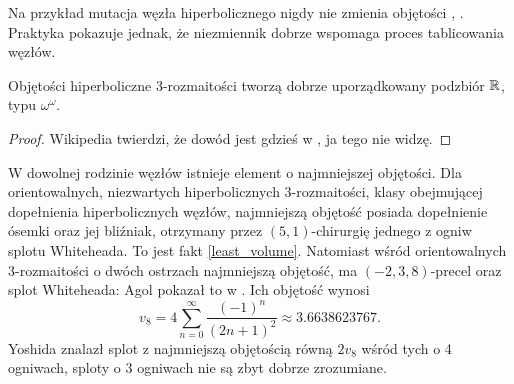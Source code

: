 Na przykład mutacja węzła hiperbolicznego nigdy nie zmienia objętości \cite{ruberman87}, \cite[s. 124]{adams94}.
Praktyka pokazuje jednak, że niezmiennik dobrze wspomaga proces tablicowania węzłów.

\begin{proposition}
    Objętości hiperboliczne 3-rozmaitości tworzą dobrze uporządkowany podzbiór $\mathbb R$, typu $\omega^\omega$.
\end{proposition}

\begin{proof}
    Wikipedia twierdzi, że dowód jest gdzieś w \cite{neumann85}, ja tego nie widzę.
\end{proof}

W dowolnej rodzinie węzłów istnieje element o najmniejszej objętości.
Dla orientowalnych, niezwartych hiperbolicznych 3-rozmaitości, klasy obejmującej dopełnienia hiperbolicznych węzłów, najmniejszą objętość posiada dopełnienie ósemki oraz jej bliźniak, otrzymany przez $(5, 1)$-chirurgię jednego z ogniw splotu Whiteheada.
To jest fakt \ref{least_volume}.
Natomiast wśród orientowalnych 3-rozmaitości o dwóch ostrzach najmniejszą objętość, ma $(-2, 3, 8)$-precel oraz splot Whiteheada: Agol pokazał to w \cite{agol10}.
Ich objętość wynosi
\begin{equation}
    v_8 = 4 \sum_{n=0}^\infty \frac{(-1)^n}{(2n+1)^2} \approx 3.6638623767. %
\end{equation}
Yoshida \cite{yoshida13} znalazł splot z najmniejszą objętością równą $2v_8$ wśród tych o 4 ogniwach, sploty o 3 ogniwach nie są zbyt dobrze zrozumiane.


